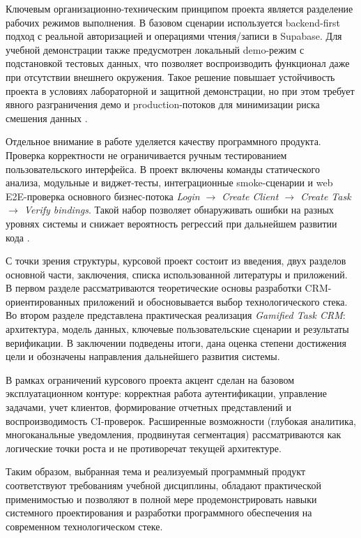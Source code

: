 Ключевым организационно-техническим принципом проекта является разделение рабочих режимов выполнения. В базовом сценарии используется backend-first подход с реальной авторизацией и операциями чтения/записи в Supabase. Для учебной демонстрации также предусмотрен локальный demo-режим с подстановкой тестовых данных, что позволяет воспроизводить функционал даже при отсутствии внешнего окружения. Такое решение повышает устойчивость проекта в условиях лабораторной и защитной демонстрации, но при этом требует явного разграничения демо и production-потоков для минимизации риска смешения данных \cite{repoReadme,owaspM4}.

Отдельное внимание в работе уделяется качеству программного продукта. Проверка корректности не ограничивается ручным тестированием пользовательского интерфейса. В проект включены команды статического анализа, модульные и виджет-тесты, интеграционные smoke-сценарии и web E2E-проверка основного бизнес-потока \textit{Login $\rightarrow$ Create Client $\rightarrow$ Create Task $\rightarrow$ Verify bindings}. Такой набор позволяет обнаруживать ошибки на разных уровнях системы и снижает вероятность регрессий при дальнейшем развитии кода \cite{repoReadme,testingBook}.

С точки зрения структуры, курсовой проект состоит из введения, двух разделов основной части, заключения, списка использованной литературы и приложений. В первом разделе рассматриваются теоретические основы разработки CRM-ориентированных приложений и обосновывается выбор технологического стека. Во втором разделе представлена практическая реализация \textit{Gamified Task CRM}: архитектура, модель данных, ключевые пользовательские сценарии и результаты верификации. В заключении подведены итоги, дана оценка степени достижения цели и обозначены направления дальнейшего развития системы.

В рамках ограничений курсового проекта акцент сделан на базовом эксплуатационном контуре: корректная работа аутентификации, управление задачами, учет клиентов, формирование отчетных представлений и воспроизводимость CI-проверок. Расширенные возможности (глубокая аналитика, многоканальные уведомления, продвинутая сегментация) рассматриваются как логические точки роста и не противоречат текущей архитектуре.

Таким образом, выбранная тема и реализуемый программный продукт соответствуют требованиям учебной дисциплины, обладают практической применимостью и позволяют в полной мере продемонстрировать навыки системного проектирования и разработки программного обеспечения на современном технологическом стеке.
